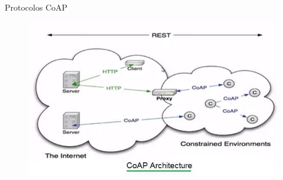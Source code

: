 \documentclass[t]{beamer}
\begin{document}
\begin{frame}{Protocolos}
CoAP
\begin{figure}
	\includegraphics[width=\linewidth]{CoAP-Architecture}
\end{figure}
\end{frame}
\frame{\titlepage}
\end{document}
